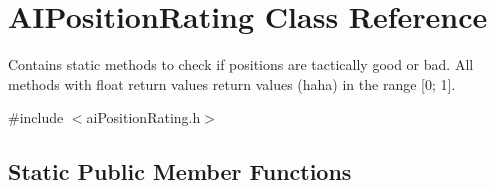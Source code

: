 \hypertarget{classAIPositionRating}{
\section{\-A\-I\-Position\-Rating \-Class \-Reference}
\label{d8/d90/classAIPositionRating}
}


\-Contains static methods to check if positions are tactically good or bad. \-All methods with float return values return values (haha) in the range \mbox{[}0; 1\mbox{]}.  




{\ttfamily \#include $<$ai\-Position\-Rating.\-h$>$}

\subsection*{\-Static \-Public \-Member \-Functions}

